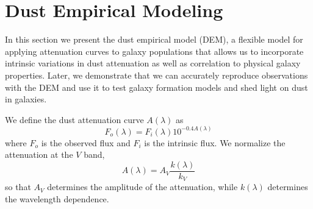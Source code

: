 \section{Dust Empirical Modeling} \label{sec:dem}
In this section we present the dust empirical model (DEM), a flexible model for
applying attenuation curves to galaxy populations that allows us to incorporate
intrinsic variations in dust attenuation as well as correlation to physical
galaxy properties. Later, we demonstrate that we can accurately reproduce
observations with the DEM and use it to test galaxy formation models and shed
light on dust in galaxies. 

We define the dust attenuation curve $A(\lambda)$ as 
\begin{equation} 
    F_o (\lambda) = F_i (\lambda) 10^{-0.4 A(\lambda)}
\end{equation}
where $F_o$ is the observed flux and $F_i$ is the intrinsic flux. We normalize
the attenuation at the $V$ band, 
\begin{equation} 
    A(\lambda) = A_V \frac{k(\lambda)}{k_V}
\end{equation}
so that $A_V$ determines the amplitude of the attenuation, while $k(\lambda)$
determines the wavelength dependence. 


